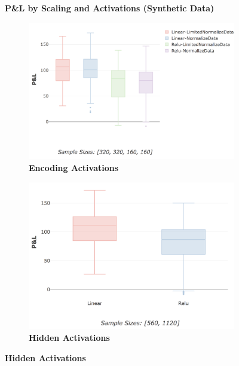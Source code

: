 \documentclass[a4paper,11pt,oneside]{article}
\theoremstyle{plain}
\theoremstyle{definition}
\begin{document}
\begin{figure}[H]
	\centering
	\textbf{P\&L by Scaling and Activations (Synthetic Data)}
	\begin{subfigure}{.5\textwidth}
		\centering 
		\includegraphics[scale=0.25]{images/results/activations/synth_pl_scaling.png}
		\caption[P\&L by Scaling and Activations (Synthetic Data) - Encoding Activations]{\textbf{Encoding Activations} 
			\newline }
		\label{figure-synth_pl_scaling}
	\end{subfigure}%
	\begin{subfigure}{.5\textwidth}
		\centering 
		\includegraphics[scale=0.25]{images/results/activations/synth_pl_hidden.png}
		\caption[P\&L by Scaling and Activations (Synthetic Data) - Hidden Activations]{\textbf{Hidden Activations} 
			\newline }

\end{subfigure}
\end{figure}
\end{document}
